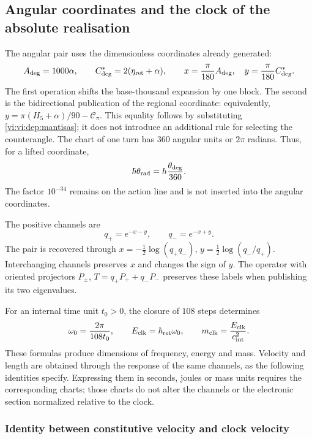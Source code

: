 \subsection{Angular coordinates and the clock of the absolute realisation}
\label{vi:vi:dep:reloj}

The angular pair uses the dimensionless coordinates already generated:
\begin{equation}
 A_{\deg}=1000\alpha,\qquad
 C^*_{\deg}=2(\eta_{\rm ret}+\alpha),\qquad
 x=\frac{\pi}{180}A_{\deg},\quad
 y=\frac{\pi}{180}C^*_{\deg}.
 \label{vi:vi:dep:angulos}
\end{equation}
The first operation shifts the base-thousand expansion by one block.
The second is the bidirectional publication of the regional coordinate:
equivalently,
\(y=\pi(H_5+\alpha)/90-\mathcal C_\pi\).
This equality follows by substituting \eqref{vi:vi:dep:mantisas}; it does not
introduce an additional rule for selecting the counterangle.
The chart of one turn has \(360\) angular units or \(2\pi\)
radians. Thus, for a lifted coordinate,
\[
 \hbar\theta_{\rm rad}
 =h\frac{\theta_{\deg}}{360}.
\]
The factor \(10^{-34}\) remains on the action line and is not
inserted into the angular coordinates.

The positive channels are
\[
 q_+=e^{-x-y},\qquad q_-=e^{-x+y}.
\]
The pair is recovered through
\(x=-\tfrac12\log(q_+q_-)\),
\(y=\tfrac12\log(q_-/q_+)\). Interchanging channels preserves
\(x\) and changes the sign of \(y\). The operator with oriented
projectors \(P_\pm\),
\(T=q_+P_++q_-P_-\) preserves these labels when publishing its two
eigenvalues.

For an internal time unit \(t_0>0\), the closure of \(108\)
steps determines
\begin{equation}
 \omega_0=\frac{2\pi}{108t_0},\qquad
 E_{\rm clk}=\hbar_{\rm ret}\omega_0,
 \qquad m_{\rm clk}=\frac{E_{\rm clk}}{c_{\rm int}^{2}}.
 \label{vi:vi:dep:reloj-absoluto}
\end{equation}
These formulas produce dimensions of frequency, energy and mass.
Velocity and length are obtained through the response of the
same channels, as the following identities specify. Expressing them
in seconds, joules or mass units requires the corresponding
charts; those charts do not alter the channels or the electronic
section normalized relative to the clock.

\subsubsection{Identity between constitutive velocity and clock velocity}

